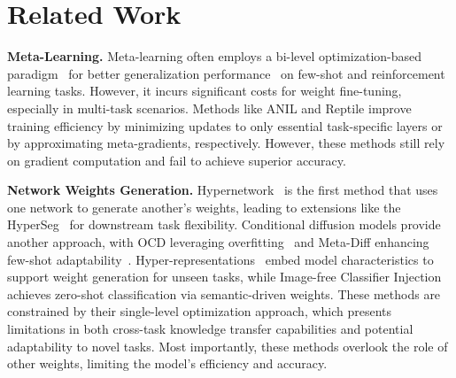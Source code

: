 \section{Related Work}\label{sec:related_work}
\noindent\textbf{Meta-Learning.}
Meta-learning often employs a bi-level optimization-based paradigm~\cite{MAML,ANIL, meta_baseline, meta_bootstrap, on_convergence} for better generalization performance~\cite{generalization_information_1,generalization_information_2,generalization_information_3,generalization_PAC_1,generalization_stable_1} on few-shot and reinforcement learning tasks. However, it incurs significant costs for weight fine-tuning, especially in multi-task scenarios. Methods like ANIL \cite{ANIL} and Reptile \cite{REPTILE} improve training efficiency by minimizing updates to only essential task-specific layers or by approximating meta-gradients, respectively. However, these methods still rely on gradient computation and fail to achieve superior accuracy.
\par
\noindent\textbf{Network Weights Generation.} 
Hypernetwork~\cite{hypernetworks} is the first method that uses one network to generate another's weights, leading to extensions like the HyperSeg~\cite{hypernetwork_2} for downstream task flexibility. Conditional diffusion models provide another approach, with OCD leveraging overfitting~\cite{OCD} and Meta-Diff enhancing few-shot adaptability~\cite{MetaDiff}. Hyper-representations~\cite{VAE_weights} embed model characteristics to support weight generation for unseen tasks, while Image-free Classifier Injection~\cite{ICIS} achieves zero-shot classification via semantic-driven weights. These methods are constrained by their single-level optimization approach, which presents limitations in both cross-task knowledge transfer capabilities and potential adaptability to novel tasks. Most importantly, these methods overlook the role of other weights, limiting the model's efficiency and accuracy.











    


